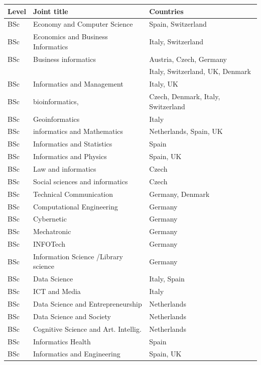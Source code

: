\begin{table}
\begin{center}
\label{tab:unis}
\begin{tabular}  {|l|l|l|}
\hline
{\bf Level}&{\bf Joint title} & {\bf Countries}\\
\hline
BSc & Economy and Computer Science & Spain, Switzerland \\
\hline
BSc & Economics and Business Informatics & Italy, Switzerland \\
\hline
BSc & Business informatics  &  Austria, Czech, Germany \\
                                             &&Italy, Switzerland, UK, Denmark\\
\hline
BSc & Informatics and Management    & Italy,  UK \\
\hline
BSc & bioinformatics,  & Czech, Denmark, Italy, Switzerland\\
\hline
BSc & Geoinformatics   & Italy\\
\hline
BSc & informatics and Mathematics   & Netherlands, Spain, UK\\
\hline
BSc & Informatics and Statistics   & Spain\\
\hline
BSc & Informatics and Physics   & Spain, UK\\
\hline
BSc & Law and informatics   &  Czech \\
\hline
BSc & Social sciences and informatics   & Czech \\
\hline
BSc & Technical Communication    & Germany, Denmark\\
\hline
BSc & Computational Engineering   & Germany\\
\hline
BSc & Cybernetic  &  Germany\\
\hline
BSc & Mechatronic   & Germany\\
\hline
BSc & INFOTech   & Germany\\
\hline
BSc & Information Science /Library science   & Germany\\
\hline
BSc & Data Science   & Italy, Spain\\
\hline
BSc & ICT and Media   & Italy\\
\hline
BSc & Data Science and Entrepreneurship   & Netherlands\\
\hline
BSc & Data Science and Society   & Netherlands\\
\hline
BSc & Cognitive Science and Art. Intellig.   & Netherlands\\
\hline
BSc & Informatics Health  &Spain\\
\hline
BSc & Informatics and  Engineering   & Spain,  UK\\

\end{tabular}
\end{center}
\end{table}
